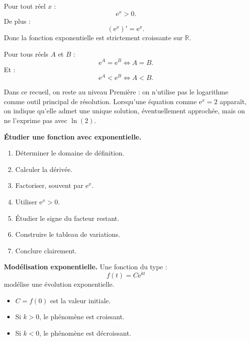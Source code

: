 \documentclass[11pt,a4paper]{article}
\newcommand{\R}{\mathbb{R}}
\newcommand{\e}{\mathrm{e}}
\begin{document}
\begin{rappelbox}
Pour tout réel $x$ :
\[
\e^x>0.
\]
De plus :
\[
(\e^x)'=\e^x.
\]
Donc la fonction exponentielle est strictement croissante sur $\R$.
\end{rappelbox}

\begin{rappelbox}
Pour tous réels $A$ et $B$ :
\[
\e^A=\e^B \Longleftrightarrow A=B.
\]
Et :
\[
\e^A<\e^B \Longleftrightarrow A<B.
\]
\end{rappelbox}

\begin{attentionbox}
Dans ce recueil, on reste au niveau Première : on n'utilise pas le logarithme comme outil principal de résolution. Lorsqu'une équation comme $\e^x=2$ apparaît, on indique qu'elle admet une unique solution, éventuellement approchée, mais on ne l'exprime pas avec $\ln(2)$.
\end{attentionbox}

\begin{methodebox}
\textbf{Étudier une fonction avec exponentielle.}
\begin{enumerate}
    \item Déterminer le domaine de définition.
    \item Calculer la dérivée.
    \item Factoriser, souvent par $\e^x$.
    \item Utiliser $\e^x>0$.
    \item Étudier le signe du facteur restant.
    \item Construire le tableau de variations.
    \item Conclure clairement.
\end{enumerate}
\end{methodebox}

\begin{methodebox}
\textbf{Modélisation exponentielle.}
Une fonction du type :
\[
f(t)=C\e^{kt}
\]
modélise une évolution exponentielle.
\begin{itemize}
    \item $C=f(0)$ est la valeur initiale.
    \item Si $k>0$, le phénomène est croissant.
    \item Si $k<0$, le phénomène est décroissant.
\end{itemize}
\end{methodebox}

\newpage

\end{document}
